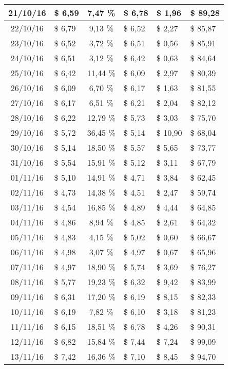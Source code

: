 \begin{center}
\begin{small}
\begin{longtable}{|c|l|c|l|l|l|}
21/10/16 & \$ 6,59 & 7,47 \% & \$ 6,78 & \$ 1,96 & \$ 89,28 \\ \hline
22/10/16 & \$ 6,79 & 9,13 \% & \$ 6,52 & \$ 2,27 & \$ 85,87 \\ \hline
23/10/16 & \$ 6,52 & 3,72 \% & \$ 6,51 & \$ 0,56 & \$ 85,91 \\ \hline
24/10/16 & \$ 6,51 & 3,12 \% & \$ 6,42 & \$ 0,63 & \$ 84,64 \\ \hline
25/10/16 & \$ 6,42 & 11,44 \% & \$ 6,09 & \$ 2,97 & \$ 80,39 \\ \hline
26/10/16 & \$ 6,09 & 6,70 \% & \$ 6,17 & \$ 1,63 & \$ 81,55 \\ \hline
27/10/16 & \$ 6,17 & 6,51 \% & \$ 6,21 & \$ 2,04 & \$ 82,12 \\ \hline
28/10/16 & \$ 6,22 & 12,79 \% & \$ 5,73 & \$ 3,03 & \$ 75,70 \\ \hline
29/10/16 & \$ 5,72 & 36,45 \% & \$ 5,14 & \$ 10,90 & \$ 68,04 \\ \hline
30/10/16 & \$ 5,14 & 18,50 \% & \$ 5,57 & \$ 5,65 & \$ 73,77 \\ \hline
31/10/16 & \$ 5,54 & 15,91 \% & \$ 5,12 & \$ 3,11 & \$ 67,79 \\ \hline
01/11/16 & \$ 5,10 & 14,91 \% & \$ 4,71 & \$ 3,84 & \$ 62,45 \\ \hline
02/11/16 & \$ 4,73 & 14,38 \% & \$ 4,51 & \$ 2,47 & \$ 59,74 \\ \hline
03/11/16 & \$ 4,54 & 16,85 \% & \$ 4,89 & \$ 4,44 & \$ 64,85 \\ \hline
04/11/16 & \$ 4,86 & 8,94 \% & \$ 4,85 & \$ 2,61 & \$ 64,32 \\ \hline
05/11/16 & \$ 4,83 & 4,15 \% & \$ 5,02 & \$ 0,60 & \$ 66,67 \\ \hline
06/11/16 & \$ 4,98 & 3,07 \% & \$ 4,97 & \$ 0,67 & \$ 65,96 \\ \hline
07/11/16 & \$ 4,97 & 18,90 \% & \$ 5,74 & \$ 3,69 & \$ 76,27 \\ \hline
08/11/16 & \$ 5,77 & 19,23 \% & \$ 6,32 & \$ 9,42 & \$ 83,99 \\ \hline
09/11/16 & \$ 6,31 & 17,20 \% & \$ 6,19 & \$ 8,15 & \$ 82,33 \\ \hline
10/11/16 & \$ 6,19 & 7,82 \% & \$ 6,10 & \$ 3,18 & \$ 81,23 \\ \hline
11/11/16 & \$ 6,15 & 18,51 \% & \$ 6,78 & \$ 4,26 & \$ 90,31 \\ \hline
12/11/16 & \$ 6,82 & 15,84 \% & \$ 7,44 & \$ 7,24 & \$ 99,09 \\ \hline
13/11/16 & \$ 7,42 & 16,36 \% & \$ 7,10 & \$ 8,45 & \$ 94,70 \\ \hline

\end{longtable}
\end{small}
\end{center}
